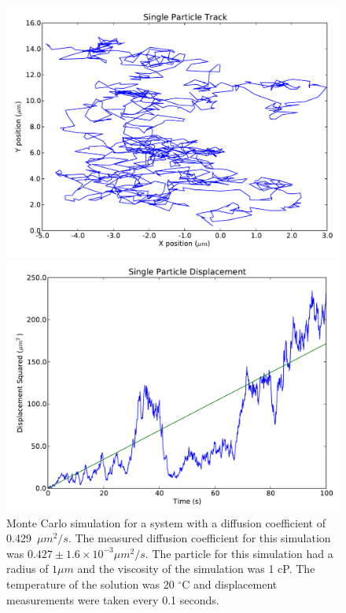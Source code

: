 \documentclass[11pt,letterpaper]{article}
\begin{document}
\begin{figure}
    \centering
    \begin{minipage}[t]{0.485\textwidth}
        \centering
        \includegraphics[width=\textwidth]{figures/brownian_track.pdf}
    \end{minipage}
    \begin{minipage}[t]{0.485\textwidth}
        \centering
        \includegraphics[width=\textwidth]{figures/brownian_dispsq.pdf}
    \end{minipage}
    \caption{Monte Carlo simulation for a system with a diffusion coefficient of
        \mbox{0.429 $\mu m^2 / s$}. The measured diffusion coefficient for this
        simulation was \mbox{$0.427 \pm 1.6 \times 10^{-3} \mu m^2 / s$}. The
        particle for this simulation had a radius of $1 \mu m$ and the viscosity
        of the simulation was 1 cP. The temperature of the solution was 20
        $^\circ \text{C}$ and displacement measurements were taken every 0.1
        seconds.}
    \label{brownian_sim}
\end{figure}
\end{document}
